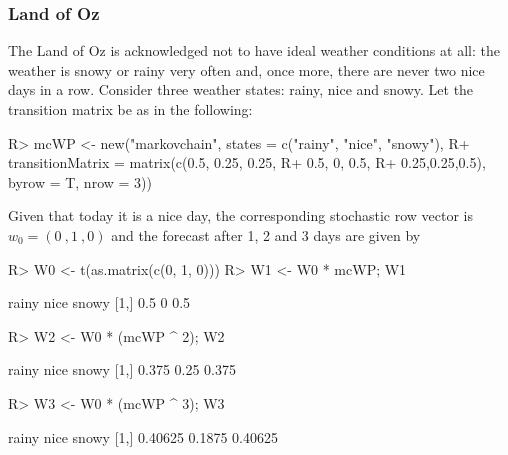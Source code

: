 \documentclass[article,nojss]{jss}
\begin{document}
\hypertarget{sec:wfLandOfOz}{%
\subsubsection{Land of Oz}\label{sec:wfLandOfOz}}

The Land of Oz is
acknowledged not to have ideal weather conditions at all:
the weather is snowy or rainy very often and, once more, there are never two
nice days in a row. Consider three weather states: rainy, nice and snowy. Let the transition matrix be as in the following:

\begin{CodeChunk}

\begin{CodeInput}
R> mcWP <- new("markovchain", states = c("rainy", "nice", "snowy"),
R+          transitionMatrix = matrix(c(0.5, 0.25, 0.25,
R+                                    0.5, 0, 0.5,
R+                                    0.25,0.25,0.5), byrow = T, nrow = 3))
\end{CodeInput}
\end{CodeChunk}

Given that today it is a nice day, the corresponding stochastic row vector is
\(w_{0}=(0\:,1\:,0)\) and the forecast after 1, 2 and 3 days are given by

\begin{CodeChunk}

\begin{CodeInput}
R> W0 <- t(as.matrix(c(0, 1, 0)))
R> W1 <- W0 * mcWP; W1
\end{CodeInput}

\begin{CodeOutput}
     rainy nice snowy
[1,]   0.5    0   0.5
\end{CodeOutput}

\begin{CodeInput}
R> W2 <- W0 * (mcWP ^ 2); W2
\end{CodeInput}

\begin{CodeOutput}
     rainy nice snowy
[1,] 0.375 0.25 0.375
\end{CodeOutput}

\begin{CodeInput}
R> W3 <- W0 * (mcWP ^ 3); W3
\end{CodeInput}

\begin{CodeOutput}
       rainy   nice   snowy
[1,] 0.40625 0.1875 0.40625
\end{CodeOutput}
\end{CodeChunk}
\end{document}
